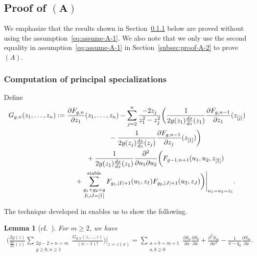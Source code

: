 \documentclass[pdftex]{sigma}
\newtheorem{lem}[thm]{Lemma}
\theoremstyle{definition}
\numberwithin{equation}{section}
\def\p{\partial}
\begin{document}
\subsection[Proof of $(A)$]{Proof of $\boldsymbol{(A)}$}
\label{section:proof-of-A}

We emphasize that the results shown in Section~\ref{subsec:proof-A-1} below
are proved without using the assumption~\eqref{eq:assume-A-1}.
We also note that we only use the second equality
in assumption~\eqref{eq:assume-A-1} in Section~\ref{subsec:proof-A-2}
to prove~$(A)$.

\subsubsection{Computation of principal specializations}
\label{subsec:proof-A-1}

Def\/ine
\begin{gather}
G_{g,n}(z_{1},\dots,z_{n}) :=
\frac{\p F_{g,n}}{\p z_{1}}(z_{1},\dots,z_{n})-\sum_{j=2}^{n} \frac{-2z_{j}}{z_{1}^{2}-z_{j}^{2}}
\biggl( \frac{1}{2y(z_{1})\frac{dx}{dz}(z_{1})}
\frac{\p F_{g,n-1}}{\p z_{1}}(z_{[\hat{j}]})
\nonumber\\
\hphantom{G_{g,n}(z_{1},\dots,z_{n}) :=}{}
 - \frac{1}{2y(z_{j})\frac{dx}{dz}(z_{j})}
\frac{\p F_{g,n-1}}{\p z_{j}}(z_{[\hat{1}]}) \biggr)
\nonumber\\
\hphantom{G_{g,n}(z_{1},\dots,z_{n}) :=}{}
+ \frac{1}{2y(z_{1})\frac{dx}{dz}(z_{1})} \frac{\p^{2}}{\p u_{1} \p u_{2}}
\biggl( F_{g-1,n+1}(u_{1},u_{2},z_{[\hat{1}]})\nonumber\\
\hphantom{G_{g,n}(z_{1},\dots,z_{n}) :=}{}
+ \sum_{\substack{g_{1}+g_{2}=g \\ I \sqcup J = [\hat{1}]}}^{\rm stable}
F_{g_{1}, |I|+1}(u_{1},z_{I}) F_{g_{2}, |J|+1}(u_{2}, z_{J})
\biggr)\Biggr|_{u_{1}=u_{2}=z_{1}}.
\label{eq:Ggn}
\end{gather}

The technique developed in
\cite{DM14, DM14-2} enables us to show the following.

\begin{lem} [cf.~]
\label{prop:partial-Riccati}
For $m \ge 2$, we have
\begin{gather} \label{eq:partial-Riccati}
\Biggl(\frac{2y(z)}{\frac{dx}{dz}(z)}
\sum_{\substack{2g-2+n=m \\ g\ge0, n\ge 1}}
\frac{G_{g,n}(z,\dots,z)}{(n-1)!} \Biggr)\Biggl|_{z=z(x)} =
\sum_{\substack{a+b=m+1 \\ a,b \ge 0}}
\frac{\p S_{a}}{\p x} \frac{\p S_{b}}{\p x} +
\frac{\p^{2} S_{m}}{\p x^{2}} - \frac{1}{x-q_{0}} \frac{\p S_{m}}{\p x}.
\end{gather}
\end{lem}
\end{document}
